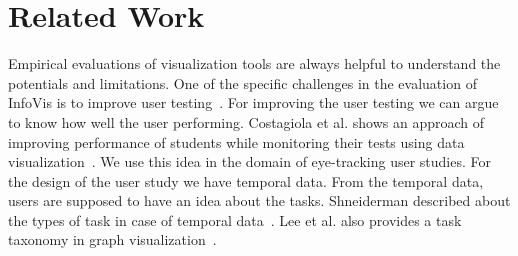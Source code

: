 \section{Related Work}

Empirical evaluations of visualization tools are always helpful to understand the potentials and limitations. One of the specific challenges in the evaluation of InfoVis is to improve user testing~\cite{plaisant2004challenge}. For improving the user testing we can argue to know how well the user performing. Costagiola et al. shows an approach of improving performance of students while monitoring their tests using data visualization~\cite{costagliola2009monitoring}. We use this idea in the domain of eye-tracking user studies. For the design of the user study we have temporal data. From the temporal data, users are supposed to have an idea about the tasks. Shneiderman described about the types of task in case of temporal data~\cite{shneiderman1996eyes}. Lee et al. also provides a task taxonomy in graph visualization~\cite{lee2006task}.  

